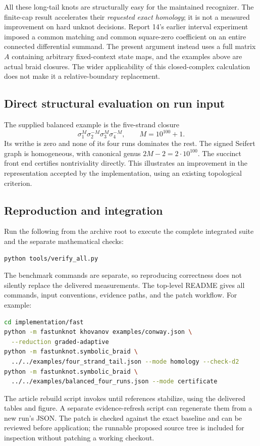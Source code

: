 All these long-tail knots are structurally easy for the maintained recognizer. The finite-cap result accelerates their \emph{requested exact homology}; it is not a measured improvement on hard unknot decisions. Report 14's earlier interval experiment imposed a common matching and common square-zero coefficient on an entire connected differential summand. The present argument instead uses a full matrix $A$ containing arbitrary fixed-context state maps, and the examples above are actual braid closures. The wider applicability of this closed-complex calculation does not make it a relative-boundary replacement.

\subsection{Direct structural evaluation on run input}
The supplied balanced example is the five-strand closure
\[
 \sigma_1^M\sigma_2^{-M}\sigma_3^M\sigma_4^{-M},\qquad M=10^{100}+1.
\]
Its writhe is zero and none of its four runs dominates the rest. The signed Seifert graph is homogeneous, with canonical genus $2M-2=2\cdot10^{100}$. The succinct front end certifies nontriviality directly. This illustrates an improvement in the representation accepted by the implementation, using an existing topological criterion.


\subsection{Reproduction and integration}
Run the following from the archive root to execute the complete integrated suite and the separate mathematical checks:
\begin{lstlisting}[language=bash]
python tools/verify_all.py
\end{lstlisting}
The benchmark commands are separate, so reproducing correctness does not silently replace the delivered measurements. The top-level README gives all commands, input conventions, evidence paths, and the patch workflow. For example:
\begin{lstlisting}[language=bash]
cd implementation/fast
python -m fastunknot khovanov examples/conway.json \
  --reduction graded-adaptive
python -m fastunknot.symbolic_braid \
  ../../examples/four_strand_tail.json --mode homology --check-d2
python -m fastunknot.symbolic_braid \
  ../../examples/balanced_four_runs.json --mode certificate
\end{lstlisting}
The article rebuild script invokes  until references stabilize, using the delivered tables and figure. A separate evidence-refresh script can regenerate them from a new run's JSON. The patch is checked against the exact baseline and can be reviewed before application; the runnable proposed source tree is included for inspection without patching a working checkout.

